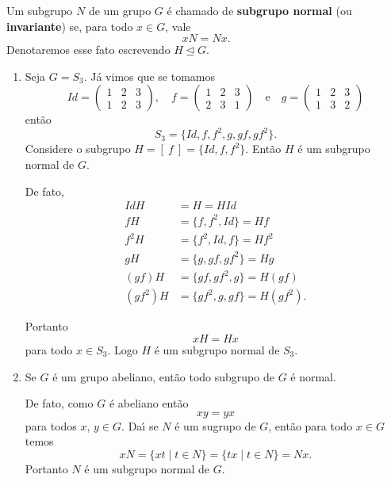 \begin{definicao}
    Um subgrupo $N$ de um grupo $G$ \'e chamado de \textbf{subgrupo normal} (ou \textbf{invariante}) se, para todo $x \in G$, vale
    \[
        xN = Nx.
    \]
    Denotaremos esse fato escrevendo $H \unlhd G$.
\end{definicao}

\begin{exemplos}
    \begin{enumerate}[label={\arabic*})]
        \item Seja $G = S_3$. J\'a vimos que se tomamos
        \[
            Id = \begin{pmatrix}
                1 & 2 & 3\\
                1 & 2 & 3
            \end{pmatrix}, \quad
            f = \begin{pmatrix}
                1 & 2 & 3\\
                2 & 3 & 1
            \end{pmatrix} \quad \mbox{e}\quad
            g = \begin{pmatrix}
                1 & 2 & 3\\
                1 & 3 & 2
            \end{pmatrix}
        \]
        ent\~ao
        \[
            S_3 = \{Id, f, f^2, g, gf, gf^2\}.
        \]
        Considere o subgrupo $H = [\ f\ ] = \{Id, f, f^2\}$. Ent\~ao $H$ \'e um subgrupo normal de $G$.
        \begin{solucao}
        	De fato,
        	\begin{align*}
        		IdH &= H = HId\\
        		fH &= \{f, f^2, Id\} = Hf\\
        		f^2H &= \{f^2, Id, f\} = Hf^2\\
        		gH &= \{g, gf, gf^2\} = Hg\\
        		(gf)H &= \{gf, gf^2, g\} = H(gf)\\
        		(gf^2)H &= \{gf^2, g, gf\} = H(gf^2).
        	\end{align*}

        	Portanto
        	\[
        		xH = Hx
        	\]
        	para todo $x \in S_3$. Logo $H$ \'e um subgrupo normal de $S_3$.
        \end{solucao}

        \item Se $G$ \'e um grupo abeliano, ent\~ao todo subgrupo de $G$ \'e normal.
        \begin{solucao}
        	De fato, como $G$ \'e abeliano ent\~ao
        	\[
        		xy = yx
        	\]
        	para todos $x$, $y \in G$. Da{\'\i} se $N$ \'e um sugrupo de $G$, ent\~ao para todo $x \in G$ temos
        	\[
        		xN = \{xt \mid t \in N\} = \{tx \mid t \in N\} = Nx.
        	\]
        	Portanto $N$ \'e um subgrupo normal de $G$.
        \end{solucao}


\end{enumerate}
\end{exemplos}
